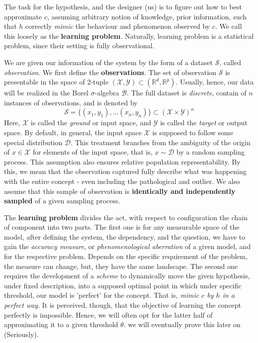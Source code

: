 The task for the hypothesis, and the designer (us) is to figure out how to best approximate $c$, assuming arbitrary notion of knowledge, prior information, such that $h$ correctly \textit{mimic} the behaviour and phenomenon observed by $c$. We call this loosely as the \textbf{learning problem}. Naturally, learning problem is a statistical problem, since their setting is fully observational. 

We are given our information of the system by the form of a dataset $\mathcal{S}$, called \textit{observation}. We first define the \textbf{observations}. The set of observation $\mathcal{S}$ is presentable in the space of 2-tuple $(\mathcal{X},\mathcal{Y})\subset(\mathbb{R}^{d},\mathbb{R}^{p})$. Usually, hence, our data will be realized in the Borel $\sigma$-algebra $\mathcal{B}$. The full dataset is \textit{discrete}, contain of $n$ instances of observations, and is denoted by \begin{equation}
    \mathcal{S} = \{ (x_1,y_1),\dots(x_n,y_n) \} \subset (\mathcal{X}\times \mathcal{Y})^n 
\end{equation}
Here, $\mathcal{X}$ is called the \textit{ground} or input space, and $\mathcal{Y}$ is called the \textit{target} or output space. By default, in general, the input space $\mathcal{X}$ is supposed to follow some special distribution $\mathcal{D}$. This treatment branches from the ambiguity of the origin of $x\in\mathcal{X}$ for elements of the input space, that is, $x\sim \mathcal{D}$ by a random sampling process. This assumption also ensures relative population representability. By this, we mean that the observation captured fully describe what was happening with the entire concept - even including the pathological and outlier. We also assume that this sample of observation is \textbf{identically and independently sampled} of a given sampling process. 

The \textbf{learning problem} divides the act, with respect to configuration the chain of component into two parts. The first one is for any measurable space of the model, after defining the system, the dependency, and the question, we have to gain the \textit{accuracy measure}, or \textit{phenomenological aberration} of a given model, and for the respective problem. Depends on the specific requirement of the problem, the measure can change, but, they have the same landscape. The second one requires the development of a \textit{scheme} to dynamically move the given hypothesis, under fixed description, into a supposed optimal point in which under specific threshold, our model is 'perfect' for the concept. That is, \textit{mimic $c$ by $h$ in a perfect way}. It is perceived, though, that the objective of learning the concept perfectly is impossible. Hence, we will often opt for the latter half of approximating it to a given threshold $\theta$. we will eventually prove this later on (Seriously). 

